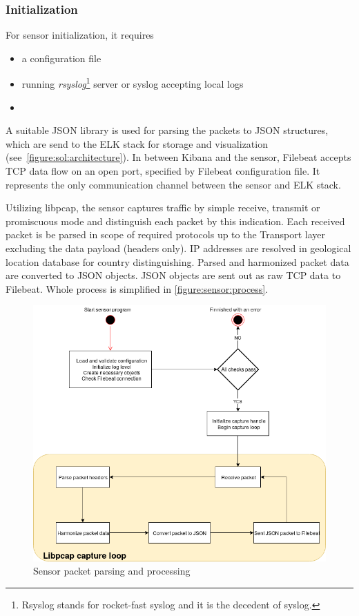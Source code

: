 \documentclass[12pt,a4paper,twoside]{report}
\begin{document}
			\subsubsection*{Initialization}
				For sensor initialization, it requires
				\begin{itemize}
					\item a configuration file
					\item running \emph{rsyslog}\footnote{Rsyslog stands for rocket-fast syslog and it is the decedent of syslog.} server or syslog accepting local logs
					\item 
				\end{itemize}
				A suitable JSON library is used for parsing the packets to JSON structures, which are send to the ELK stack for storage and visualization (see~\autoref{figure:sol:architecture}). In between Kibana and the sensor, Filebeat accepts TCP data flow on an open port, specified by Filebeat configuration file. It represents the only communication channel between the sensor and ELK stack.\par
				Utilizing libpcap, the sensor captures traffic by simple receive, transmit or promiscuous mode and distinguish each packet by this indication. Each received packet is be parsed in scope of required protocols up to the Transport layer excluding the data payload (headers only). IP addresses are resolved in geological location database for country distinguishing. Parsed and harmonized packet data are converted to JSON objects. JSON objects are sent out as raw TCP data to Filebeat. Whole process is simplified in \autoref{figure:sensor:process}.
				\begin{figure}[h]
					\centering
					\includegraphics[scale=0.35]{sensor_process}
					\caption{Sensor packet parsing and processing}
					\label{figure:sensor:process}
				\end{figure}
\end{document}
